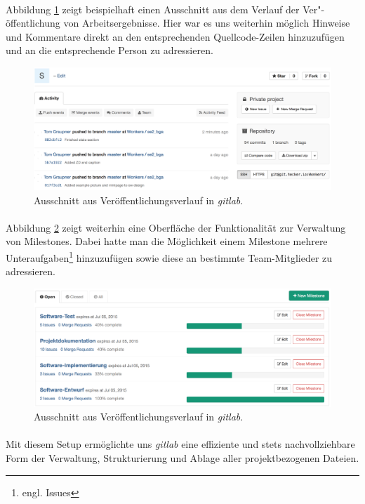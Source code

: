 \paragraph{}Abbildung \ref{gl_commit} zeigt beispielhaft einen Ausschnitt aus dem Verlauf der Ver"-öffentlichung von Arbeitsergebnisse. Hier war es uns weiterhin möglich Hinweise und Kommentare direkt an den entsprechenden Quellcode-Zeilen hinzuzufügen und an die entsprechende Person zu adressieren.

\hspace*{1cm}
\begin{figure}[h!]
	\centering
	\includegraphics[width=\textwidth]{images/gl_commits.png}
	\caption{Ausschnitt aus Veröffentlichungsverlauf in \textit{gitlab}.}
	\label{gl_commit}
\end{figure}

\newpage
\paragraph{}Abbildung \ref{gl_milestone} zeigt weiterhin eine Oberfläche der Funktionalität zur Verwaltung von Milestones. Dabei hatte man die Möglichkeit einem Milestone mehrere Unteraufgaben\footnote{engl. Issues} hinzuzufügen sowie diese an bestimmte Team-Mitglieder zu adressieren.

\hspace*{1cm}
\begin{figure}[h!]
	\centering
	\includegraphics[width=\textwidth]{images/gl_milestones.png}
	\caption{Ausschnitt aus Veröffentlichungsverlauf in \textit{gitlab}.}
	\label{gl_milestone}
\end{figure}

\paragraph{}Mit diesem Setup ermöglichte uns \textit{gitlab} eine effiziente und stets nachvollziehbare Form der Verwaltung, Strukturierung und Ablage aller projektbezogenen Dateien.



